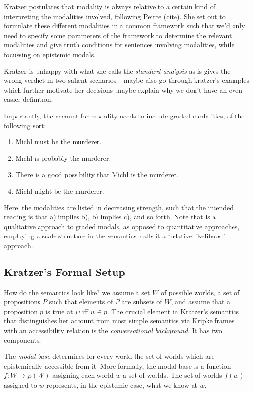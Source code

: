 \documentclass{article}
\theoremstyle{definition}
\begin{document}
Kratzer postulates that modality is always relative to a certain kind of interpreting the modalities involved, following Peirce (cite).
She set out to formulate these different modalities in a common framework such that we'd only need to specify some parameters of the framework to determine the relevant modalities and give truth conditions for sentences involving modalities, while focussing on epistemic modals.

Kratzer is unhappy with what she calls the \emph{standard analysis} as is gives the wrong verdict in two salient scenarios.
--maybe also go through kratzer's examples which further motivate her decisions--maybe explain why we don't have an even easier definition.

Importantly, the account for modality needs to include graded modalities, of the following sort:
\begin{enumerate}[nosep,label=\alph*)]
  \item Michl must be the murderer.
  \item Michl is probably the murderer.
  \item There is a good possibility that Michl is the murderer.
  \item Michl might be the murderer.
\end{enumerate}
Here, the modalities are listed in decreasing strength, such that the intended reading is that a) implies b), b) implies c), and so forth. Note that is a qualitative approach to graded modals, as opposed to quantitative approaches, employing a scale structure in the semantics.
\textcite{yalcin10_probab_operat} calls it a `relative likelihood' approach.

\subsection{Kratzer's Formal Setup}
How do the semantics look like?
we assume a set $W$ of possible worlds, a set of propositions $P$ such that elements of $P$ are subsets of $W$, and assume that a proposition $p$ is true at $w$ iff $w \in p$.
The crucial element in Kratzer's semantics that distinguishes her account from most simple semantics via Kripke frames with an accessibility relation is the \emph{conversational background}.
It has two components.

The \emph{modal base} determines for every world the set of worlds which are epistemically accessible from it.
More formally, the modal base is a function $f: W \rightarrow \wp(W)$ assigning each world $w$ a set of worlds.
The set of worlds $f(w)$ assigned to $w$ represents, in the epistemic case, what we know at $w$.
\end{document}
